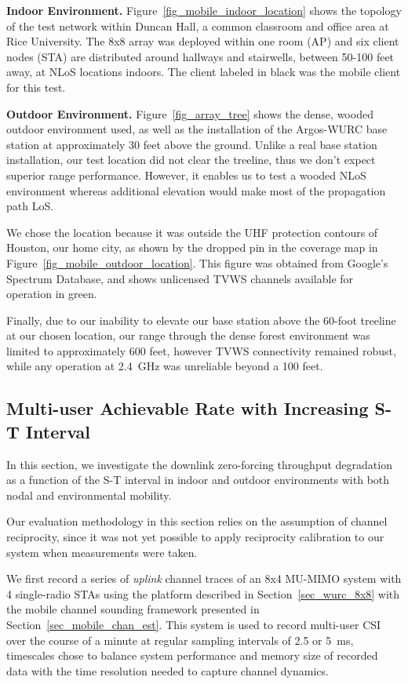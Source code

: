 \textbf{Indoor Environment.}
	Figure~\ref{fig_mobile_indoor_location} shows the topology of the test network within Duncan Hall, a common classroom and office area at Rice University.
	The 8x8 array was deployed within one room (AP) and six client nodes (STA) are distributed around hallways and stairwells, between 50-100 feet away, at \ac{NLoS} locations indoors.
	The client labeled in black was the mobile client for this test.

\textbf{Outdoor Environment.}
Figure~\ref{fig_array_tree} shows the dense, wooded outdoor environment used, as well as the installation of the Argos-WURC base station at approximately 30 feet above the ground.
Unlike a real base station installation, our test location did not clear the treeline, thus we don't expect superior range performance.
However, it enables us to test a wooded \ac{NLoS} environment whereas additional elevation would make most of the propagation path \ac{LoS}.

We chose the location because it was outside the UHF protection contours of Houston, our home city, as shown by the dropped pin in the coverage map in Figure~\ref{fig_mobile_outdoor_location}.
This figure was obtained from Google's Spectrum Database, and shows unlicensed \ac{TVWS} channels available for operation in green.

Finally, due to our inability to elevate our base station above the 60-foot treeline at our chosen location, our range through the dense forest environment was limited to approximately 600 feet, however \ac{TVWS} connectivity remained robust, while any operation at 2.4~GHz was unreliable beyond a 100 feet.

\subsection{Multi-user Achievable Rate with Increasing S-T Interval}
\label{sec:uhf_outdoor_results}

 In this section, we investigate the downlink zero-forcing throughput degradation as a function of the S-T interval in indoor and outdoor environments with both nodal and environmental mobility.

 Our evaluation methodology in this section relies on the assumption of channel reciprocity, since it was not yet possible to apply reciprocity calibration to our system when measurements were taken.

 We first record a series of \textit{uplink} channel traces of an 8x4 \ac{MU-MIMO} system with 4 single-radio \acp{STA} using the platform described in Section~\ref{sec_wurc_8x8} with the mobile channel sounding framework presented in Section~\ref{sec_mobile_chan_est}.
 This system is used to record multi-user \ac{CSI} over the course of a minute at regular sampling intervals of 2.5 or 5~ms, timescales chose to balance system performance and memory size of recorded data with the time resolution needed to capture channel dynamics.

